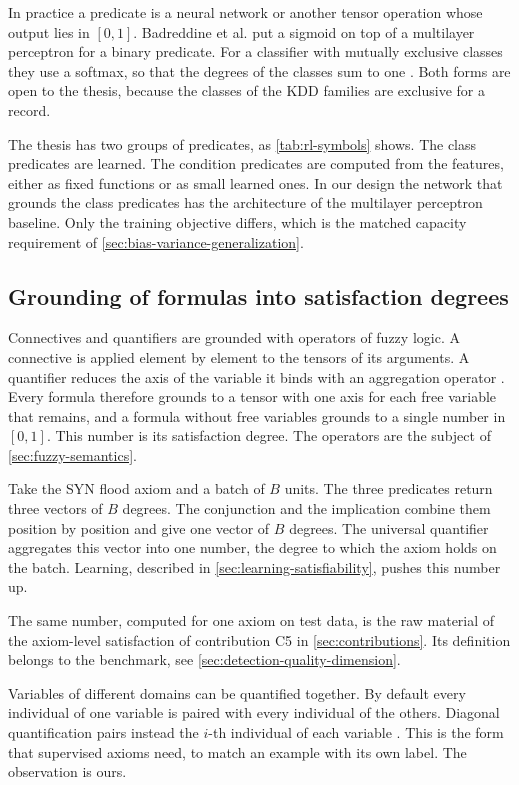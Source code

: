 In practice a predicate is a neural network or another tensor operation whose
output lies in $[0,1]$. Badreddine et al. put a sigmoid on top of a multilayer
perceptron for a binary predicate. For a classifier with mutually exclusive
classes they use a softmax, so that the degrees of the classes sum to one
\citep{badreddine2022ltn}. Both forms are open to the thesis, because the
classes of the KDD families are exclusive for a record.

The thesis has two groups of predicates, as \cref{tab:rl-symbols} shows. The
class predicates are learned. The condition predicates are computed from the
features, either as fixed functions or as small learned ones. In our design the
network that grounds the class predicates has the architecture of the
multilayer perceptron baseline. Only the training objective differs, which is
the matched capacity requirement of \cref{sec:bias-variance-generalization}.

\subsection{Grounding of formulas into satisfaction degrees}
\label{sec:grounding-formulas}

Connectives and quantifiers are grounded with operators of fuzzy logic. A
connective is applied element by element to the tensors of its arguments. A
quantifier reduces the axis of the variable it binds with an aggregation
operator \citep{badreddine2022ltn}. Every formula therefore grounds to a
tensor with one axis for each free variable that remains, and a formula
without free variables grounds to a single number in $[0,1]$. This number is
its satisfaction degree. The operators are the subject of
\cref{sec:fuzzy-semantics}.

Take the SYN flood axiom and a batch of $B$ units. The three predicates
return three vectors of $B$ degrees. The conjunction and the implication
combine them position by position and give one vector of $B$ degrees. The
universal quantifier aggregates this vector into one number, the degree to
which the axiom holds on the batch. Learning, described in
\cref{sec:learning-satisfiability}, pushes this number up.

The same number, computed for one axiom on test data, is the raw material of
the axiom-level satisfaction of contribution C5 in \cref{sec:contributions}.
Its definition belongs to the benchmark, see
\cref{sec:detection-quality-dimension}.

Variables of different domains can be quantified together. By default every
individual of one variable is paired with every individual of the others.
Diagonal quantification pairs instead the $i$-th individual of each variable
\citep{badreddine2022ltn}. This is the form that supervised axioms need, to
match an example with its own label. The observation is ours.



